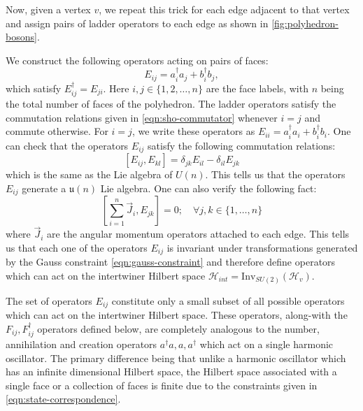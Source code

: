\documentclass[twocolumn,final,aps,nofootinbib,nobibnotes]{revtex4-2}
\newcommand{\mc}[1]{\mathcal{#1}}
\newcommand{\mf}[1]{\mathfrak{#1}}
\begin{document}
Now, given a vertex $ v $, we repeat this trick for each edge adjacent to that vertex and assign pairs of ladder operators to each edge as shown in \autoref{fig:polyhedron-bosons}.

We construct the following operators \cite{Girelli2005Reconstructing,Livine2006Reconstructing} acting on pairs of faces:
\begin{equation}\label{eqn:angle-ops}
	E_{ij} = a^\dag_i a_j + b^\dag_i b_j,
\end{equation}
which satisfy $ E^{\dag}_{ij} = E_{ji} $. Here $ i,j \in \{1,2,\ldots,n\}$ are the face labels, with $ n $ being the total number of faces of the polyhedron. The ladder operators satisfy the commutation relations given in \eqref{eqn:sho-commutator} whenever $ i=j $ and commute otherwise. For $ i=j $, we write these operators as $ E_{ii} = a^{\dag}_i a_i + b^{\dag}_i b_i $. One can check that the operators $ E_{ij} $ satisfy the following commutation relations:
\begin{equation}\label{eqn:u-n-commutators}
	[E_{ij}, E_{kl}] = \delta_{jk} E_{il} - \delta_{il} E_{jk}
\end{equation}
which is the same as the Lie algebra of $ U(n) $. This tells us \cite{Freidel2009The-Fine,Freidel2010UN-Coherent} that the operators $ E_{ij} $ generate a $ \mf{u}(n) $ Lie algebra. One can also verify the following fact:
\begin{equation}\label{eqn:angle-ops-invariance}
	\left[ \sum_{i=1}^n \vec{J}_i, E_{jk} \right] = 0; \quad \forall j,k \in \{1,\ldots,n\}
\end{equation}
where $ \vec{J}_i $ are the angular momentum operators attached to each edge. This tells us that each one of the operators $ E_{ij} $ is invariant under transformations generated by the Gauss constraint \eqref{eqn:gauss-constraint} and therefore define operators which can act on the intertwiner Hilbert space $ \mc{H}_{int} = \text{Inv}_{SU(2)}(\mc{H}_v) $.

The set of operators $ E_{ij} $ constitute only a small subset of all possible operators which can act on the intertwiner Hilbert space. These operators, along-with the $ F_{ij}, F^\dag_{ij} $ operators defined below, are completely analogous to the number, annihilation and creation operators $ a^\dag a, a, a^\dag $ which act on a single harmonic oscillator. The primary difference being that unlike a harmonic oscillator which has an infinite dimensional Hilbert space, the Hilbert space associated with a single face or a collection of faces is finite due to the constraints given in \eqref{eqn:state-correspondence}. 
\end{document}
